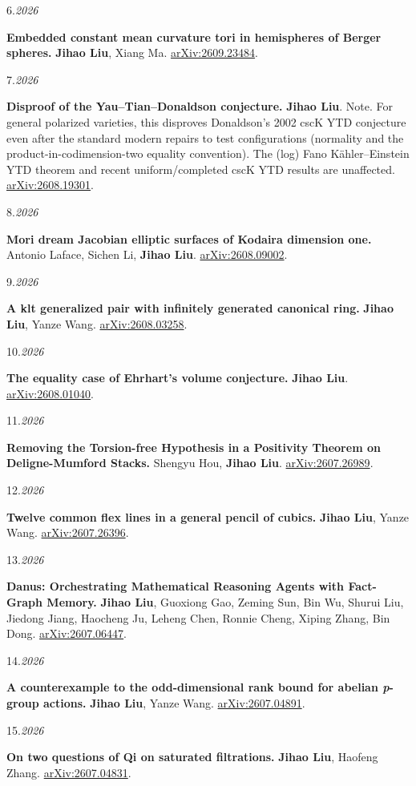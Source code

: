\documentclass[11pt]{article}
\newlength{\datewidth}
\newcommand{\pubitem}[3]{%
  \noindent
  \begin{minipage}[t]{\datewidth}
    \raggedright\small\color{muted}#1.\;\textit{#2}
  \end{minipage}%
  \hfill%
  \begin{minipage}[t]{\dimexpr\linewidth-\datewidth-0.1in\relax}
    \raggedright #3
  \end{minipage}\par\vspace{4pt}
}
\newcommand{\paper}[1]{\textbf{#1}}
\newcommand{\me}{\textbf{Jihao Liu}}
\begin{document}
\pubitem{6}{2026}{%
  \paper{Embedded constant mean curvature tori in hemispheres of Berger spheres.}
  \me, Xiang Ma.
  \href{https://arxiv.org/abs/2609.23484}{arXiv:2609.23484}.}


\pubitem{7}{2026}{%
  \paper{Disproof of the Yau--Tian--Donaldson conjecture.}
  \me.
  Note. For general polarized varieties, this disproves Donaldson’s 2002 cscK YTD conjecture even after the standard modern repairs to test configurations (normality and the product-in-codimension-two equality convention). The (log) Fano Kähler--Einstein YTD theorem and recent uniform/completed cscK YTD results are unaffected.
  \href{https://arxiv.org/abs/2608.19301}{arXiv:2608.19301}.}


\pubitem{8}{2026}{%
  \paper{Mori dream Jacobian elliptic surfaces of Kodaira dimension one.}
  Antonio Laface, Sichen Li, \me.
  \href{https://arxiv.org/abs/2608.09002}{arXiv:2608.09002}.}


\pubitem{9}{2026}{%
  \paper{A klt generalized pair with infinitely generated canonical ring.}
  \me, Yanze Wang.
  \href{https://arxiv.org/abs/2608.03258}{arXiv:2608.03258}.}


\pubitem{10}{2026}{%
  \paper{The equality case of Ehrhart’s volume conjecture.}
  \me.
  \href{https://arxiv.org/abs/2608.01040}{arXiv:2608.01040}.}


\pubitem{11}{2026}{%
  \paper{Removing the Torsion-free Hypothesis in a Positivity Theorem on Deligne-Mumford Stacks.}
  Shengyu Hou, \me.
  \href{https://arxiv.org/abs/2607.26989}{arXiv:2607.26989}.}


\pubitem{12}{2026}{%
  \paper{Twelve common flex lines in a general pencil of cubics.}
  \me, Yanze Wang.
  \href{https://arxiv.org/abs/2607.26396}{arXiv:2607.26396}.}


\pubitem{13}{2026}{%
  \paper{Danus: Orchestrating Mathematical Reasoning Agents with Fact-Graph Memory.}
  \me, Guoxiong Gao, Zeming Sun, Bin Wu, Shurui Liu, Jiedong Jiang, Haocheng Ju, Leheng Chen, Ronnie Cheng, Xiping Zhang, Bin Dong.
  \href{https://arxiv.org/abs/2607.06447}{arXiv:2607.06447}.}


\pubitem{14}{2026}{%
  \paper{A counterexample to the odd-dimensional rank bound for abelian \emph{p}-group actions.}
  \me, Yanze Wang.
  \href{https://arxiv.org/abs/2607.04891}{arXiv:2607.04891}.}


\pubitem{15}{2026}{%
  \paper{On two questions of Qi on saturated filtrations.}
  \me, Haofeng Zhang.
  \href{https://arxiv.org/abs/2607.04831}{arXiv:2607.04831}.}
\end{document}
